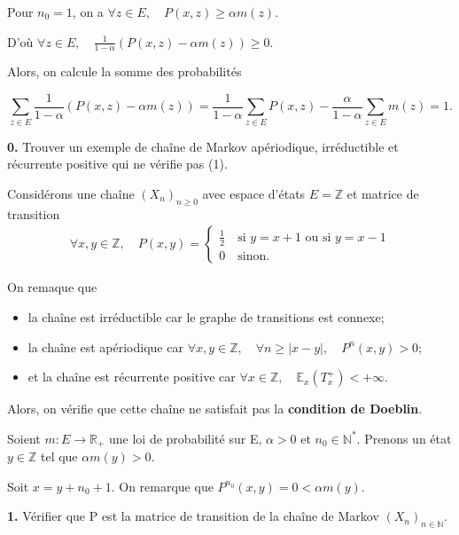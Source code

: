 \documentclass[french]{article}
\begin{document}
	Pour $n_0 = 1$, on a $\forall z \in E, \quad P(x,z) \geq \alpha m(z)$.
	
	D'où $\forall z \in E, \quad \frac{1}{1-\alpha}\left(P(x, z) - \alpha m(z)\right) \geq 0$.
	
	Alors, on calcule la somme des probabilités
	
	$$ \sum_{z \in E} \frac{1}{1-\alpha}\left(P(x, z) - \alpha m(z)\right) = \frac{1}{1 - \alpha} \sum_{z \in E} P(x, z) - \frac{\alpha}{1 - \alpha} \sum_{z \in E} m(z) = 1.$$
	
	\begin{tcolorbox}[colback=gray!5!white,colframe=gray!75!black]
		\textbf{0.} Trouver un exemple de chaîne de Markov apériodique, irréductible et récurrente positive qui ne vérifie pas (1).
	\end{tcolorbox}
	
	Considérons une chaîne $(X_n)_{n \geq 0}$ avec espace d'états $E = \mathbb{Z}$ et matrice de transition
	\begin{align}
		\forall x,y \in \mathbb{Z}, \quad P(x, y) =\begin{cases}
			\frac{1}{2} \quad \text{si $y = x+1$ ou si $y = x-1$}\\
			0 \quad \text{sinon.}
		\end{cases}
	\end{align}
	
	On remaque que
	\begin{itemize}
		\item la chaîne est irréductible car le graphe de transitions est connexe;
		\item la chaîne est apériodique car $\forall x,y \in \mathbb{Z}, \quad \forall n \geq |x-y|, \quad P^{n}(x,y)> 0$;
		\item et la chaîne est récurrente positive car $\forall x \in \mathbb{Z}, \quad \mathbb{E}_x(T_x^+)  < +\infty$.
	\end{itemize} 

	Alors, on vérifie que cette chaîne ne satisfait pas la \textbf{condition de Doeblin}.
	
	Soient $m : E \to \mathbb{R}_+$ une loi de probabilité sur E, $\alpha > 0$ et $n_0 \in \mathbb{N}^*$. Prenons un état $y \in \mathbb{Z}$ tel que $\alpha m(y) > 0$.
	
	Soit $x = y + n_0 + 1$. On remarque que $ P^{n_0}(x, y) = 0 < \alpha m(y).$
	
	
	\begin{tcolorbox}[colback=gray!5!white,colframe=gray!75!black]
		\textbf{1.} Vérifier que P est la matrice de transition de la chaîne de Markov $(X_n)_{n \in \mathbb{N}}$.
	\end{tcolorbox}
\end{document}
